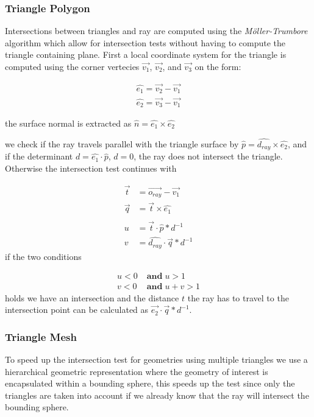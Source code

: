 \documentclass[a4paper, twocolumn]{article}
\begin{document}
        \subsubsection{Triangle Polygon} \label{sec:triangle_polygon}
        
        Intersections between triangles and ray are computed using the \textit{Möller-Trumbore} algorithm which allow for intersection tests without having to compute the triangle containing plane. First a local coordinate system for the triangle is computed using the corner vertecies \(\vec{v_1}\), \(\vec{v_2}\), and \(\vec{v_3}\) on the form:

\begin{align*}
    \hat{e_1} = \vec{v_2} - \vec{v_1} \\
    \hat{e_2} = \vec{v_3} - \vec{v_1}
\end{align*}

the surface normal is extracted as \( \hat{n} =\hat{e_1} \times \hat{e_2} \)

we check if the ray travels parallel with the triangle surface by \(\hat{p} = \hat{d_{ray}} \times \hat{e_2}\), and if the determinant  \(d = \hat{e_1} \cdot \hat{p}\), \(d = 0 \), the ray does not intersect the triangle. Otherwise the intersection test continues with

\begin{align*}
    \vec{t} &= \vec{o_{ray}} - \vec{v_1} \\
    \vec{q} &= \vec{t} \times \hat{e_1} \\\\
    u &= \vec{t} \cdot \hat{p} * d^{-1} \\
    v &= \hat{d_{ray}} \cdot \vec{q} * d^{-1}
\end{align*} 
if the two conditions
 
\begin{align*}
    u < 0 \; &\textbf{and} \; u > 1 \\
    v < 0 \; &\textbf{and}  \; u + v > 1 
\end{align*}
holds we have an intersection and the distance \(t\) the ray has to travel to the intersection point can be calculated as \(\vec{e_2} \cdot \vec{q} * d^{-1} \).

        
        \subsubsection{Triangle Mesh} \label{sec:triangle_mesh}
        
        To speed up the intersection test for geometries using multiple triangles we use a hierarchical geometric representation where the geometry of interest is encapsulated within a bounding sphere, this speeds up the test since only the triangles are taken into account if we already know that the ray will intersect the bounding sphere.
\end{document}
